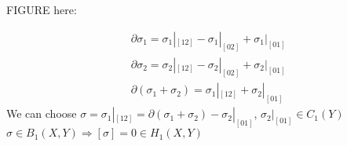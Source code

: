 \documentclass[11pt,a4paper]{report}
\begin{document}
\begin{Ex}
              FIGURE here:
              
              \begin{align*}
               &\partial \sigma_1 = \sigma_1 |_{[12]}  - \sigma_1 |_{[02]}  + \sigma_1 |_{[01]}  \\
               &\partial \sigma_2 = \sigma_2 |_{[12]}  - \sigma_2 |_{[02]}  + \sigma_2 |_{[01]}  \\
               &\partial (\sigma_1 + \sigma_2) = \sigma_1 |_{[12]} + \sigma_2 |_{[01]}  
              \end{align*}
              We can choose $\sigma = \sigma_1 |_{[12]} = \partial (\sigma_1 + \sigma_2) - \sigma_2 |_{[01]} $, $\sigma_2 |_{[01]} \in C_1(Y)$ \\
              $\sigma \in B_1(X, Y) \Rightarrow [\sigma] = 0 \in H_1(X, Y)$ 
                
             
              
              
              
              \end{Ex}
            
\end{document}
